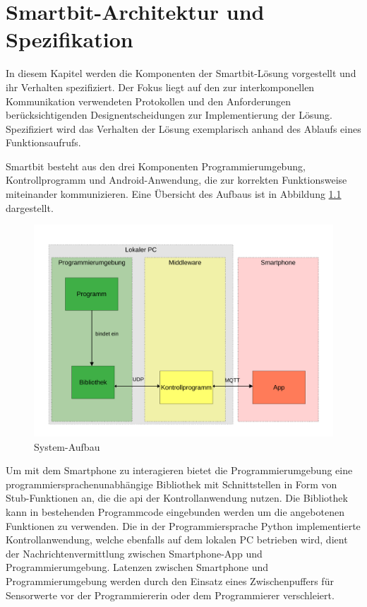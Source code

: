 \documentclass[11pt,a4paper]{report}
\begin{document}
\chapter{Smartbit-Architektur und Spezifikation} \label{chap:architektur}
In diesem Kapitel werden die Komponenten der Smartbit-Lösung vorgestellt und ihr Verhalten spezifiziert.
Der Fokus liegt auf den zur interkomponellen Kommunikation verwendeten Protokollen und den Anforderungen berücksichtigenden Designentscheidungen zur Implementierung der Lösung.
Spezifiziert wird das Verhalten der Lösung exemplarisch anhand des Ablaufs eines Funktionsaufrufs.

Smartbit besteht aus den drei Komponenten Programmierumgebung, Kontrollprogramm und Android-Anwendung, die zur korrekten Funktionsweise miteinander kommunizieren.
Eine Übersicht des Aufbaus ist in Abbildung \ref{fig:design} dargestellt.
\begin{figure}[htbp]
\centering
\includegraphics[width=\textwidth]{images/framework.pdf}
\caption{System-Aufbau}
\label{fig:design}
\end{figure}
Um mit dem Smartphone zu interagieren bietet die Programmierumgebung eine programmiersprachenunabhängige Bibliothek mit Schnittstellen in Form von Stub-Funktionen an, die die \acrfull{api} der Kontrollanwendung nutzen.
Die Bibliothek kann in bestehenden Programmcode eingebunden werden um die angebotenen Funktionen zu verwenden.
Die in der Programmiersprache Python implementierte Kontrollanwendung, welche ebenfalls auf dem lokalen PC betrieben wird, dient der Nachrichtenvermittlung zwischen Smartphone-App und Programmierumgebung.
Latenzen zwischen Smartphone und Programmierumgebung werden durch den Einsatz eines Zwischenpuffers für Sensorwerte vor der Programmiererin oder dem Programmierer verschleiert.
\end{document}
